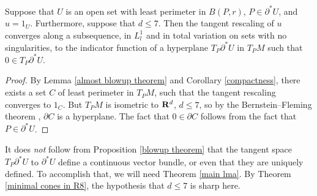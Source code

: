 \begin{proposition}\label{blowup theorem}
Suppose that $U$ is an open set with least perimeter in $B(P, r)$, $P \in \partial^* U$, and $u = 1_U$.
Furthermore, suppose that $d \leq 7$.
Then the tangent rescaling of $u$ converges along a subsequence, in $L^1_l$ and in total variation on sets with no singularities, to the indicator function of a hyperplane $T_P \partial^* U$ in $T_PM$ such that $0 \in T_P \partial^* U$.
\end{proposition}
\begin{proof}
By Lemma \ref{almost blowup theorem} and Corollary \ref{compactness}, there exists a set $C$ of least perimeter in $T_PM$, such that the tangent rescaling converges to $1_C$.
But $T_PM$ is isometric to $\mathbf{R}^d$, $d \leq 7$, so by the Bernstein--Fleming theorem \cite[Theorem 17.3]{Giusti77} \cite[\S5]{Fleming62}, $\partial C$ is a hyperplane.
The fact that $0 \in \partial C$ follows from the fact that $P \in \partial^* U$.
\end{proof}

It does \emph{not} follow from Proposition \ref{blowup theorem} that the tangent space $T_P \partial^* U$ to $\partial^* U$ define a continuous vector bundle, or even that they are uniquely defined. To accomplish that, we will need Theorem \ref{main lma}.
By Theorem \ref{minimal cones in R8}, the hypothesis that $d \leq 7$ is sharp here.